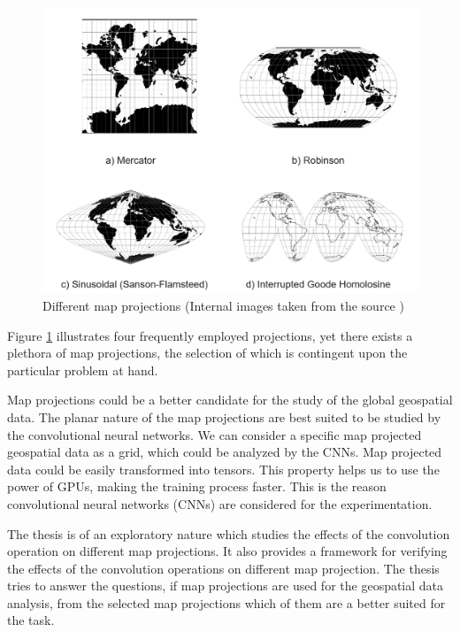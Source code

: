 \begin{figure}[h]
    \centering
    \includegraphics[width=1.0\linewidth]{figures/chapter-1/multi_projections.png}
    \caption{Different map projections (Internal images taken from the source \cite{PROJ_SITE}) }
    \label{fig:multiple-projections}
\end{figure}

Figure \ref{fig:multiple-projections} illustrates four frequently employed projections, yet there exists a plethora of map projections, the selection of which is contingent upon the particular problem at hand.

Map projections could be a better candidate for the study of the global geospatial data. The planar nature of the map projections are best suited to be studied by the convolutional neural networks. We can consider a specific map projected geospatial data as a grid, which could be analyzed by the CNNs.
Map projected data could be easily transformed into tensors. This property helps us to use the power of GPUs, making the training process faster. This is the reason convolutional neural networks (CNNs) are considered for the experimentation.

The thesis is of an exploratory nature which studies the effects of the convolution operation on different map projections. It also provides a framework for verifying the effects of the convolution operations on different map projection.
The thesis tries to answer the questions, if map projections are used for the geospatial data analysis, from the selected map projections which of them are a better suited for the task.